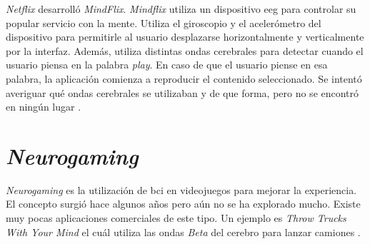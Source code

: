 \emph{Netflix} desarrolló \emph{MindFlix}. \emph{Mindflix} utiliza un dispositivo \acrshort{eeg} para controlar su popular servicio con la mente. Utiliza el giroscopio y el acelerómetro del dispositivo para permitirle al usuario desplazarse horizontalmente y verticalmente por la interfaz. Además, utiliza distintas ondas cerebrales para detectar cuando el usuario piensa en la palabra \emph{play}. En caso de que el usuario piense en esa palabra,  la aplicación comienza a reproducir el contenido seleccionado. Se intentó averiguar qué ondas cerebrales se utilizaban y de que forma, pero no se encontró en ningún lugar \cite{mindflix}.


\section{\emph{Neurogaming}}

\emph{Neurogaming} es la utilización de \acrshort{bci} en videojuegos para mejorar la experiencia. El concepto surgió hace algunos años pero aún no se ha explorado mucho. Existe muy pocas aplicaciones comerciales de este tipo. Un ejemplo es \emph{Throw Trucks With Your Mind} el cuál utiliza las ondas \emph{Beta} del cerebro para lanzar camiones \cite{neurogaming}.


